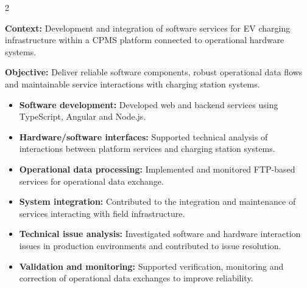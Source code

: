 \documentclass[8pt,a4paper,ragged2e,withhyper]{altacv}
\begin{document}



\makecvheader

\vspace{-0.3cm}


\begin{paracol}{2}



\textbf{Context:} Development and integration of software services for EV charging infrastructure within a CPMS platform connected to operational hardware systems.

\textbf{Objective:} Deliver reliable software components, robust operational data flows and maintainable service interactions with charging station systems.

\begin{itemize}
\item \textbf{Software development:} Developed web and backend services using TypeScript, Angular and Node.js.
\item \textbf{Hardware/software interfaces:} Supported technical analysis of interactions between platform services and charging station systems.
\item \textbf{Operational data processing:} Implemented and monitored FTP-based services for operational data exchange.
\item \textbf{System integration:} Contributed to the integration and maintenance of services interacting with field infrastructure.
\item \textbf{Technical issue analysis:} Investigated software and hardware interaction issues in production environments and contributed to issue resolution.
\item \textbf{Validation and monitoring:} Supported verification, monitoring and correction of operational data exchanges to improve reliability.
\end{itemize}


\end{paracol}
\end{document}
